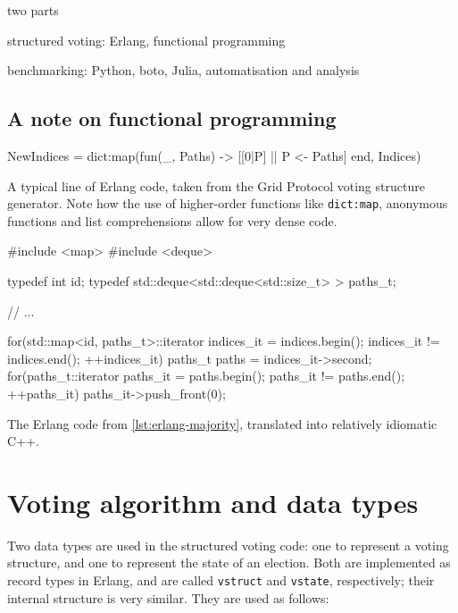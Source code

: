 \documentclass[11pt,chapterprefix=true,toc=bibliography,numbers=noendperiod,
               footnotes=multiple,twoside]{scrreprt}
\begin{document}
two parts

structured voting: Erlang, functional programming

benchmarking: Python, boto, Julia, automatisation and analysis

\subsection{A note on functional programming}

\begin{listing}[h]
    \begin{erlangcode}
NewIndices = dict:map(fun(_, Paths) -> [[0|P] || P <- Paths] end, Indices)
    \end{erlangcode}
    \caption{A typical line of Erlang code, taken from the Grid Protocol voting structure generator. Note how the use of higher-order functions like \texttt{dict:map}, anonymous functions and list comprehensions allow for very dense code.}
    \label{lst:erlang-majority}
\end{listing}

\begin{listing}[h]
    \begin{cppcode}
#include <map>
#include <deque>

typedef int id;
typedef std::deque<std::deque<std::size_t> > paths_t;

// ...

for(std::map<id, paths_t>::iterator indices_it = indices.begin();
        indices_it != indices.end(); ++indices_it) {
    paths_t paths = indices_it->second;
    for(paths_t::iterator paths_it = paths.begin();
            paths_it != paths.end(); ++paths_it) {
        paths_it->push_front(0);
    }
}
    \end{cppcode}
    \caption{The Erlang code from \autoref{lst:erlang-majority}, translated into relatively idiomatic C++.}
    \label{lst:cpp-majority}
\end{listing}

\section{Voting algorithm and data types}

Two data types are used in the structured voting code: one to represent a voting structure, and one to represent the state of an election. Both are implemented as record types in Erlang, and are called \texttt{vstruct} and \texttt{vstate}, respectively; their internal structure is very similar. They are used as follows:
\end{document}
